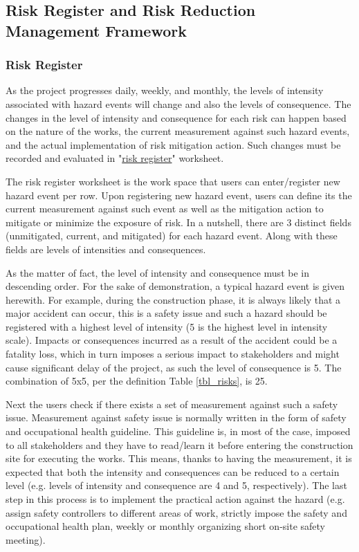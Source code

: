 \documentclass[10pt,halfline,a4paper]{ouparticle}
\begin{document}
\subsection{Risk Register and Risk Reduction Management Framework} \label{subriskregister}
\subsubsection{Risk Register}
As the project progresses daily, weekly, and monthly, the levels of intensity associated with hazard events will change and also the levels of consequence. The changes in the level of intensity and consequence for each risk can happen based on the nature of the works, the current measurement against such hazard events, and the actual implementation of risk mitigation action. Such changes must be recorded and evaluated in "\underline{risk register}" worksheet. 

The risk register worksheet is the work space that users can enter/register new hazard event per row. Upon registering new hazard event, users can define its the current measurement against such event as well as the mitigation action to mitigate or minimize the exposure of risk. In a nutshell, there are 3 distinct fields (unmitigated, current, and mitigated) for each hazard event. Along with these fields are levels of intensities and consequences. 

As the matter of fact, the level of intensity and consequence must be in descending order. For the sake of demonstration, a typical hazard event is given herewith. For example, during the construction phase, it is always likely that a major accident can occur, this is a safety issue and such a hazard should be registered with a highest level of intensity (5 is the highest level in intensity scale). Impacts or consequences incurred as a result of the accident could be a fatality loss, which in turn imposes a serious impact to stakeholders and might cause  significant delay of the project, as such the level of consequence is 5. The combination of 5x5, per the definition Table \ref{tbl_risks}, is 25. 

Next the users check if there exists a set of measurement against such a safety issue. Measurement against safety issue is normally written in the form of safety and occupational health guideline. This guideline is, in most of the case, imposed to all stakeholders and they have to read/learn it before entering the construction site for executing the works. This means, thanks to having the measurement, it is expected that both the intensity and consequences can be reduced to a certain level (e.g. levels of intensity and consequence are 4 and 5, respectively). The last step in this process is to implement the practical action against the hazard (e.g. assign safety controllers to different areas of work, strictly impose the safety and occupational health plan, weekly or monthly organizing short on-site safety meeting). 
\end{document}
